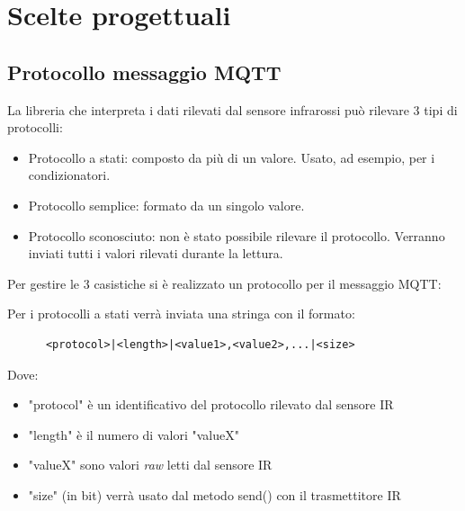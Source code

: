 \documentclass[a4paper,11pt]{article}
\begin{document}
\section{Scelte progettuali}

    \subsection{Protocollo messaggio MQTT}

    La libreria che interpreta i dati rilevati dal sensore infrarossi può rilevare 3 tipi di protocolli:
    \begin{itemize}
      \item Protocollo a stati: composto da più di un valore. Usato, ad esempio, per i condizionatori.
      \item Protocollo semplice: formato da un singolo valore.
      \item Protocollo sconosciuto: non è stato possibile rilevare il protocollo. Verranno inviati tutti i valori rilevati durante la lettura.
    \end{itemize}

    \noindent
    Per gestire le 3 casistiche si è realizzato un protocollo per il messaggio MQTT:
    \smallskip

    Per i protocolli a stati verrà inviata una stringa con il formato:

    \begin{verbatim}
      <protocol>|<length>|<value1>,<value2>,...|<size>
    \end{verbatim}

    Dove:
    \begin{itemize}
      \item "protocol" è un identificativo del protocollo rilevato dal sensore IR
      \item "length" è il numero di valori "valueX"
      \item "valueX" sono valori \emph{raw} letti dal sensore IR
      \item "size" (in bit) verrà usato dal metodo send() con il trasmettitore IR
    \end{itemize}

    \bigskip
\end{document}
